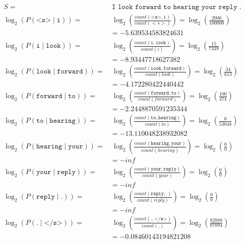\documentclass{article}
\begin{document}
\begin{equation}\begin{split}
S =&\ \texttt{I look forward to hearing your reply .} \\
\log_{2} (P(\texttt{<s>} \mid \texttt{i})) =&\  \log_{2} (\frac{count(\texttt{<s>} , \texttt{i})}{count(<s>)}) = \log_{2} (\frac{2006}{100000}) \\ & = -5.639534583824631  \\
\log_{2} (P(\texttt{i} \mid \texttt{look})) =&\  \log_{2} (\frac{count(\texttt{i} , \texttt{look})}{count(i)}) = \log_{2} (\frac{15}{7339}) \\ & = -8.93447718627382  \\
\log_{2} (P(\texttt{look} \mid \texttt{forward})) =&\  \log_{2} (\frac{count(\texttt{look} , \texttt{forward})}{count(look)}) = \log_{2} (\frac{34}{613}) \\ & = -4.172280422440442  \\
\log_{2} (P(\texttt{forward} \mid \texttt{to})) =&\  \log_{2} (\frac{count(\texttt{forward} , \texttt{to})}{count(forward)}) = \log_{2} (\frac{100}{474}) \\ & = -2.2448870591235344  \\
\log_{2} (P(\texttt{to} \mid \texttt{hearing})) =&\  \log_{2} (\frac{count(\texttt{to} , \texttt{hearing})}{count(to)}) = \log_{2} (\frac{6}{53048}) \\ & = -13.110048238932082  \\
\log_{2} (P(\texttt{hearing} \mid \texttt{your})) =&\  \log_{2} (\frac{count(\texttt{hearing} , \texttt{your})}{count(hearing)}) = \log_{2} (\frac{0}{0}) \\ & = -inf  \\
\log_{2} (P(\texttt{your} \mid \texttt{reply})) =&\  \log_{2} (\frac{count(\texttt{your} , \texttt{reply})}{count(your)}) = \log_{2} (\frac{0}{0}) \\ & = -inf  \\
\log_{2} (P(\texttt{reply} \mid \texttt{.})) =&\  \log_{2} (\frac{count(\texttt{reply} , \texttt{.})}{count(reply)}) = \log_{2} (\frac{0}{0}) \\ & = -inf  \\
\log_{2} (P(\texttt{.} \mid \texttt{</s>})) =&\  \log_{2} (\frac{count(\texttt{.} , \texttt{</s>})}{count(.)}) = \log_{2} (\frac{82888}{87894}) \\ & = -0.08460143194821208  \\

\end{split}
\end{equation}
\end{document}

